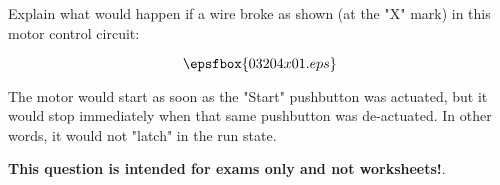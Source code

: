 

Explain what would happen if a wire broke as shown (at the "X" mark) in this motor control circuit:

$$\epsfbox{03204x01.eps}$$







The motor would start as soon as the "Start" pushbutton was actuated, but it would stop immediately when that same pushbutton was de-actuated.  In other words, it would not "latch" in the run state.







{\bf This question is intended for exams only and not worksheets!}.





